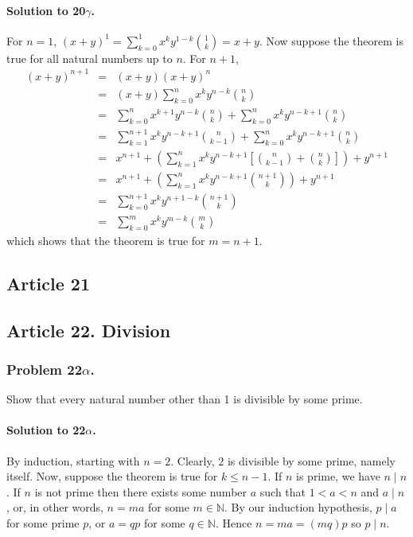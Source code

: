 \paragraph*{Solution to 20$\gamma$.}
For $n = 1$, $(x+y)^1 = \sum_{k=0}^1 x^k y^{1-k} {{1}\choose{k}} = x+y$.
Now suppose the theorem is true for all natural numbers up to $n$.
For $n+1$,
\begin{eqnarray*}
(x+y)^{n+1} &=& (x+y)(x+y)^n \\
&=& (x+y) \sum_{k=0}^n x^k y^{n-k} {{n}\choose{k}} \\
&=& \sum_{k=0}^n x^{k+1} y^{n-k} {{n}\choose{k}} + \sum_{k=0}^n x^k y^{n-k+1} {{n}\choose{k}} \\
&=& \sum_{k=1}^{n+1} x^k y^{n-k+1} {{n}\choose{k-1}} + \sum_{k=0}^n x^k y^{n-k+1} {{n}\choose{k}} \\
&=& x^{n+1} + \left( \sum_{k=1}^n x^k y^{n-k+1} \left[ {{n}\choose{k-1}} + {{n}\choose{k}} \right] \right) + y^{n+1} \\
&=& x^{n+1} + \left( \sum_{k=1}^n x^k y^{n-k+1} {{n+1}\choose{k}} \right) + y^{n+1} \\
&=& \sum_{k=0}^{n+1} x^k y^{n+1-k} {{n+1}\choose{k}} \\
&=& \sum_{k=0}^m x^k y^{m-k} {{m}\choose{k}}
\end{eqnarray*}
which shows that the theorem is true for $m = n+1$.
\subsection{Article 21}

\subsection{Article 22. Division}
\subsubsection{Problem 22$\alpha$.}
Show that every natural number other than 1 is divisible by some prime.

\paragraph*{Solution to 22$\alpha$.}
By induction, starting with $ n = 2 $. Clearly, $2$ is divisible by some prime,
namely itself. Now, suppose the theorem is true for $ k \leq n - 1 $. If $n$ is
prime, we have $n \mid n$. If $n$ is not prime then there exists some number
$ a $ such that $ 1 < a < n $ and $ a \mid n $, or, in other words, $ n = ma$
for some $m \in \mathbb{N}$. By our induction hypothesis,
$ p \mid a $ for some prime $p$, or $ a = qp $ for some
$ q \in \mathbb{N} $. Hence $ n = ma = (mq)p $ so $ p \mid n $.

